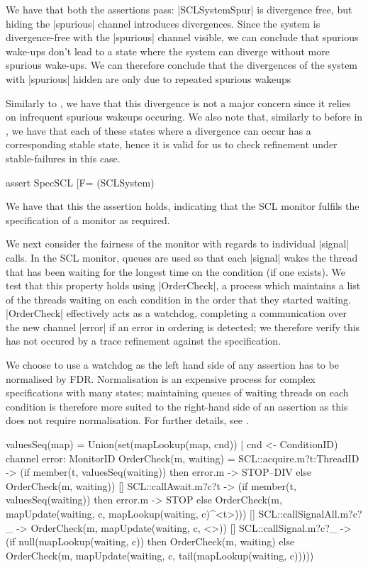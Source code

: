 We have that both the assertions pass: |SCLSystemSpur| is divergence free, but hiding the |spurious| channel introduces divergences. Since the system is divergence-free with the |spurious| channel visible, we can conclude that spurious wake-ups don't lead to a state where the system can diverge without more spurious wake-ups. We can therefore conclude that the divergences of the system with |spurious| hidden are only due to repeated spurious wakeups

Similarly to , we have that this divergence is not a major concern since it relies on infrequent spurious wakeups occuring. We also note that, similarly to before in , we have that each of these states where a divergence can occur has a corresponding stable state, hence it is valid for us to check refinement under stable-failures in this case.

\begin{cspm}
  assert SpecSCL [F= (SCLSystem) 
\end{cspm}

We have that this the assertion holds, indicating that the SCL monitor fulfils the specification of a monitor as required.

We next consider the fairness of the monitor with regards to individual |signal| calls. In the SCL monitor, queues are used so that each |signal| wakes the thread that has been waiting for the longest time on the condition (if one exists). We test that this property holds using |OrderCheck|, a process which maintains a list of the threads waiting on each condition in the order that they started waiting. |OrderCheck| effectively acts as a watchdog, completing a communication over the new channel |error| if an error in ordering is detected; we therefore verify this has not occured by a trace refinement against the specification. 

We choose to use a watchdog as the left hand side of any assertion has to be normalised by FDR. Normalisation is an expensive process for complex specifications with many states; maintaining queues of waiting threads on each condition is therefore more suited to the right-hand side of an assertion as this does not require normalisation. For further details, see \cite{RoscoeUCS}.

\begin{cspm}
valuesSeq(map) = Union({set(mapLookup(map, cnd)) | cnd <- ConditionID})
channel error: MonitorID
OrderCheck(m, waiting) = 
      SCL::acquire.m?t:ThreadID -> 
      (if member(t, valuesSeq(waiting)) then error.m -> STOP--DIV
        else OrderCheck(m, waiting))
  [] SCL::callAwait.m?c?t -> 
      (if member(t, valuesSeq(waiting)) then error.m -> STOP
        else OrderCheck(m, mapUpdate(waiting, c, mapLookup(waiting, c)^<t>)))
  [] SCL::callSignalAll.m?c?_ -> 
        OrderCheck(m, mapUpdate(waiting, c, <>))
  [] SCL::callSignal.m?c?_ -> 
      (if null(mapLookup(waiting, c)) then OrderCheck(m, waiting)
        else OrderCheck(m, mapUpdate(waiting, c, 
                                    tail(mapLookup(waiting, c)))))
\end{cspm}


